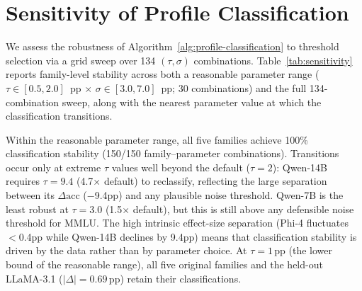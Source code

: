 \section{Sensitivity of Profile Classification}
\label{sec:classification_sensitivity}

We assess the robustness of Algorithm~\ref{alg:profile-classification} to threshold selection via a grid sweep over 134 $(\tau, \sigma)$ combinations. Table~\ref{tab:sensitivity} reports family-level stability across both a reasonable parameter range ($\tau \in [0.5, 2.0]$~pp $\times$ $\sigma \in [3.0, 7.0]$~pp; 30 combinations) and the full 134-combination sweep, along with the nearest parameter value at which the classification transitions.

\begin{table}[h]
\centering
\caption{Profile classification stability across threshold parameter ranges. All families achieve 100\% stability within the reasonable range; transitions occur only at extreme parameter values ($\geq$3$\times$ default).}
\label{tab:sensitivity}
\footnotesize
{}
\end{table}

Within the reasonable parameter range, all five families achieve 100\% classification stability (150/150 family--parameter combinations). Transitions occur only at extreme $\tau$ values well beyond the default ($\tau\!=\!2$): Qwen-14B requires $\tau\!=\!9.4$ (4.7$\times$ default) to reclassify, reflecting the large separation between its $\Delta\text{acc}$ ($-$9.4pp) and any plausible noise threshold. Qwen-7B is the least robust at $\tau\!=\!3.0$ (1.5$\times$ default), but this is still above any defensible noise threshold for MMLU. The high intrinsic effect-size separation (Phi-4 fluctuates $<$0.4pp while Qwen-14B declines by 9.4pp) means that classification stability is driven by the data rather than by parameter choice. At $\tau\!=\!1$\,pp (the lower bound of the reasonable range), all five original families and the held-out LLaMA-3.1 ($|\Delta| = 0.69$\,pp) retain their classifications.

